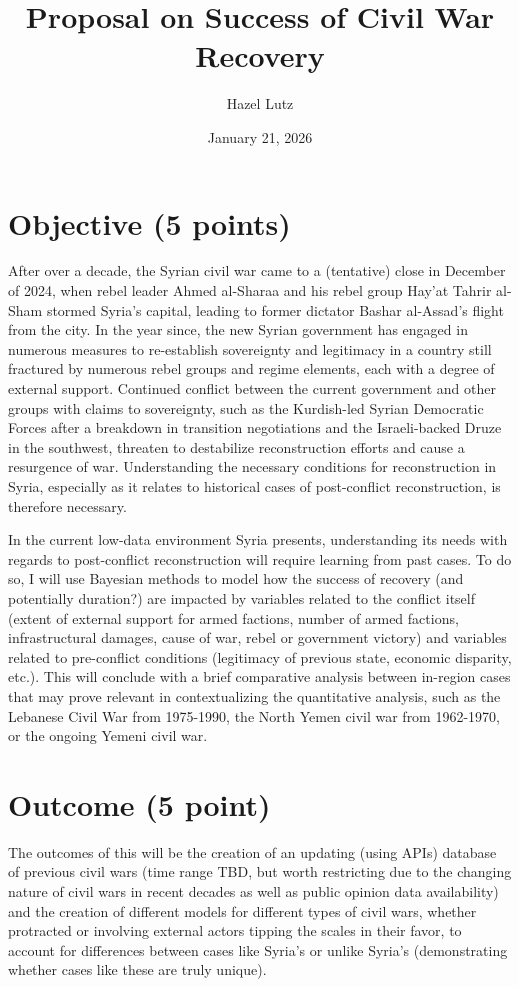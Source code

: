 \documentclass[11pt]{article}
\title{Proposal on Success of Civil War Recovery}
\author{Hazel Lutz}
\date{January 21, 2026}
\begin{document}
\maketitle

\section{Objective (5 points)}

After over a decade, the Syrian civil war came to a (tentative) close in December of 2024, when rebel leader Ahmed al-Sharaa and his rebel group Hay’at Tahrir al-Sham stormed Syria’s capital, leading to former dictator Bashar al-Assad’s flight from the city. In the year since, the new Syrian government has engaged in numerous measures to re-establish sovereignty and legitimacy in a country still fractured by numerous rebel groups and regime elements, each with a degree of external support. Continued conflict between the current government and other groups with claims to sovereignty, such as the Kurdish-led Syrian Democratic Forces after a breakdown in transition negotiations and the Israeli-backed Druze in the southwest, threaten to destabilize reconstruction efforts and cause a resurgence of war. Understanding the necessary conditions for reconstruction in Syria, especially as it relates to historical cases of post-conflict reconstruction, is therefore necessary.

In the current low-data environment Syria presents, understanding its needs with regards to post-conflict reconstruction will require learning from past cases. To do so, I will use Bayesian methods to model how the success of recovery (and potentially duration?) are impacted by variables related to the conflict itself (extent of external support for armed factions, number of armed factions, infrastructural damages, cause of war, rebel or government victory) and variables related to pre-conflict conditions (legitimacy of previous state, economic disparity, etc.). This will conclude with a brief comparative analysis between in-region cases that may prove relevant in contextualizing the quantitative analysis, such as the Lebanese Civil War from 1975-1990, the North Yemen civil war from 1962-1970, or the ongoing Yemeni civil war.


\section{Outcome (5 point)}

The outcomes of this will be the creation of an updating (using APIs) database of previous civil wars (time range TBD, but worth restricting due to the changing nature of civil wars in recent decades as well as public opinion data availability) and the creation of different models for different types of civil wars, whether protracted or involving external actors tipping the scales in their favor, to account for differences between cases like Syria’s or unlike Syria’s (demonstrating whether cases like these are truly unique).
\end{document}
